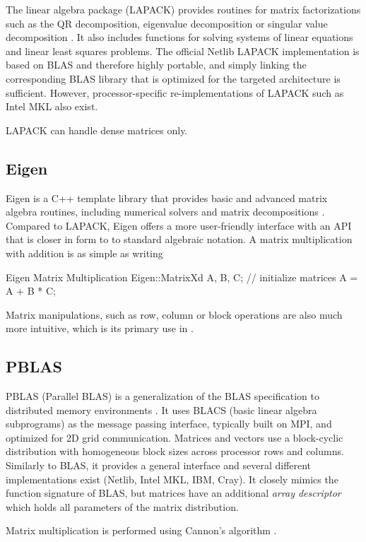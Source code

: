 The linear algebra package (LAPACK) provides routines for matrix factorizations such as the QR decomposition, eigenvalue decomposition or singular value decomposition \cite{LAP2021}. It also includes functions for solving systems of linear equations and linear least squares problems. The official Netlib LAPACK implementation is based on BLAS and therefore highly portable, and simply linking the corresponding BLAS library that is optimized for the targeted architecture is sufficient. However, processor-specific re-implementations of LAPACK such as Intel MKL also exist.

LAPACK can handle dense matrices only. 

\subsection{Eigen}

Eigen is a C++ template library that provides basic and advanced matrix algebra routines, including numerical solvers and matrix decompositions \cite{Gue2010}. Compared to LAPACK, Eigen offers a more user-friendly interface with an API that is closer in form to to standard algebraic notation. A matrix multiplication with addition is as simple as writing
\begin{cpp}{Eigen Matrix Multiplication}
Eigen::MatrixXd A, B, C;
// initialize matrices
A = A + B * C;
\end{cpp}
\noindent Matrix manipulations, such as row, column or block operations are also much more intuitive, which is its primary use in \mchem{}.

\subsection{PBLAS}

PBLAS (Parallel BLAS) is a generalization of the BLAS specification to distributed memory environments \cite{PBLAS2021}. It uses BLACS (basic linear algebra subprograms) as the message passing interface, typically built on MPI, and optimized for 2D grid communication. Matrices and vectors use a block-cyclic distribution with homogeneous block sizes across processor rows and columns. Similarly to BLAS, it provides a general interface and several different implementations exist (Netlib, Intel MKL, IBM, Cray). It closely mimics the function signature of BLAS, but matrices have an additional \emph{array descriptor} which holds all parameters of the matrix distribution.

Matrix multiplication is performed using Cannon's algorithm \cite{Can1969}.


